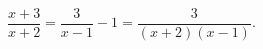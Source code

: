 \begin{ex}[type=equation]
	\begin{condition}
		$\dfrac{x + 3}{x + 2} = \dfrac{3}{x - 1} - 1 = \dfrac{3}{(x + 2)(x - 1)}.$
	\end{condition}
\end{ex}